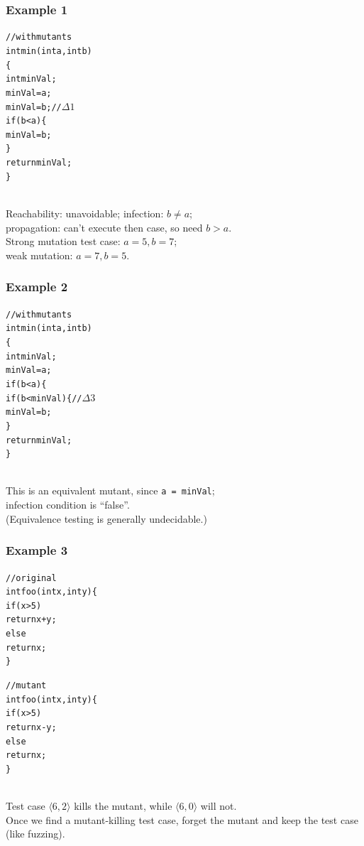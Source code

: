 \documentclass{beamer}
\newenvironment{changemargin}[1]{%
  \begin{list}{}{%
    \setlength{\topsep}{0pt}%
    \setlength{\leftmargin}{#1}%
    \setlength{\rightmargin}{1em}
    \setlength{\listparindent}{\parindent}%
    \setlength{\itemindent}{\parindent}%
    \setlength{\parsep}{\parskip}%
  }%
  \item[]}{\end{list}}
\begin{document}
\begin{frame}[fragile]
  \frametitle{Example 1}

  \begin{changemargin}{2em}
\begin{alltt}
// with mutants
int min(int a, int b)
\{
  int minVal;
  minVal = a;
  minVal = b;               // \(\Delta 1\)
  if (b < a) \{
    minVal = b;
  \}
  return minVal;
\}
\end{alltt}
~\\
Reachability: unavoidable; infection: $b \neq a$; \\
propagation: can't execute then case, so need $b > a$.\\[1em]
Strong mutation test case: $a = 5, b = 7$; \\
weak mutation: $a = 7, b = 5$.
  \end{changemargin}
\end{frame}


\begin{frame}[fragile]
  \frametitle{Example 2}

  \begin{changemargin}{2em}
\begin{alltt}
// with mutants
int min(int a, int b)
\{
  int minVal;
  minVal = a;
  if (b < a) \{
  if (b < minVal) \{         // \(\Delta 3 \)
    minVal = b;
  \}
  return minVal;
\}
\end{alltt}

~\\
This is an equivalent mutant, since \texttt{a = minVal};\\
infection condition is ``false''.\\[1em]

(Equivalence testing is generally undecidable.)
  \end{changemargin}
\end{frame}

\begin{frame}[fragile]
  \frametitle{Example 3}
\begin{minipage}{.5\textwidth} 
\begin{alltt}
  // original
  int foo(int x, int y) \{ 
  if (x > 5)
    return x + y;
  else
    return x;
  \}
\end{alltt}
\end{minipage}\begin{minipage}{.5\textwidth}
\begin{alltt}
  // mutant
  int foo(int x, int y) \{
  if (x > 5)
    return x - y;
  else
    return x;
  \}
\end{alltt}
\end{minipage}
\begin{changemargin}{2em}
  ~\\
  Test case $\langle 6,2 \rangle$ kills the mutant, while $\langle 6, 0 \rangle$ will not.\\[1em]
  Once we find a mutant-killing test case, forget the mutant and keep the test case (like fuzzing).
\end{changemargin}
\end{frame}
\end{document}
